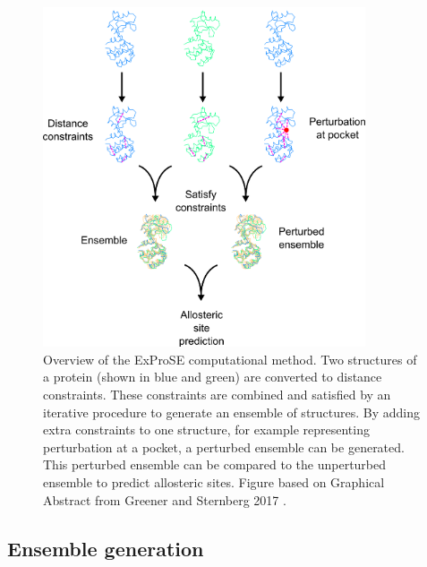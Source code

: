 \begin{figure}
\centering

\includegraphics[width=0.85\textwidth]{figures/exprose_overview/exprose_overview}

\caption{Overview of the ExProSE computational method.
Two structures of a protein (shown in blue and green) are converted to distance constraints.
These constraints are combined and satisfied by an iterative procedure to generate an ensemble of structures.
By adding extra constraints to one structure, for example representing perturbation at a pocket, a perturbed ensemble can be generated.
This perturbed ensemble can be compared to the unperturbed ensemble to predict allosteric sites.
Figure based on Graphical Abstract from Greener and Sternberg 2017 \cite{Greener2017}.}

\label{fig:exprose_overview}
\end{figure}


\subsection{Ensemble generation}



